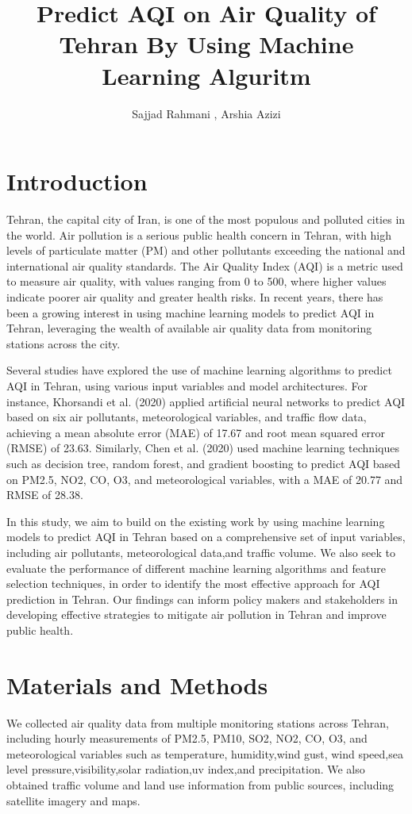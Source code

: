 \documentclass[12pt]{article}
\author{Sajjad Rahmani , Arshia Azizi}
\begin{document}
\title{Predict AQI on Air Quality of Tehran By Using Machine Learning Alguritm }
\maketitle
\section{Introduction}
Tehran, the capital city of Iran, is one of the most populous and polluted cities in the world. Air pollution is a serious public health concern in Tehran, with high levels of particulate matter (PM) and other pollutants exceeding the national and international air quality standards. The Air Quality Index (AQI) is a metric used to measure air quality, with values ranging from 0 to 500, where higher values indicate poorer air quality and greater health risks. In recent years, there has been a growing interest in using machine learning models to predict AQI in Tehran, leveraging the wealth of available air quality data from monitoring stations across the city.

Several studies have explored the use of machine learning algorithms to predict AQI in Tehran, using various input variables and model architectures. For instance, Khorsandi et al. (2020) applied artificial neural networks to predict AQI based on six air pollutants, meteorological variables, and traffic flow data, achieving a mean absolute error (MAE) of 17.67 and root mean squared error (RMSE) of 23.63. Similarly, Chen et al. (2020) used machine learning techniques such as decision tree, random forest, and gradient boosting to predict AQI based on PM2.5, NO2, CO, O3, and meteorological variables, with a MAE of 20.77 and RMSE of 28.38.

In this study, we aim to build on the existing work by using machine learning models to predict AQI in Tehran based on a comprehensive set of input variables, including air pollutants, meteorological data,and traffic volume. We also seek to evaluate the performance of different machine learning algorithms and feature selection techniques, in order to identify the most effective approach for AQI prediction in Tehran. Our findings can inform policy makers and stakeholders in developing effective strategies to mitigate air pollution in Tehran and improve public health.
\section{Materials and Methods}
We collected air quality data from multiple monitoring stations across Tehran, including hourly measurements of PM2.5, PM10, SO2, NO2, CO, O3, and meteorological variables such as temperature, humidity,wind gust, wind speed,sea level pressure,visibility,solar radiation,uv index,and precipitation. We also obtained traffic volume and land use information from public sources, including satellite imagery and maps.
\end{document}
